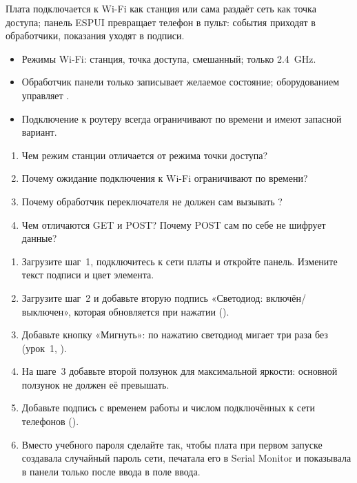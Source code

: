 \begin{summary}
Плата подключается к Wi-Fi как станция или сама раздаёт сеть как точка доступа; панель ESPUI превращает телефон
в пульт: события приходят в обработчики, показания уходят в подписи.

\begin{itemize}[leftmargin=*]
  \item Режимы Wi-Fi: станция, точка доступа, смешанный; только \SI{2.4}{GHz}.
  \item Обработчик панели только записывает желаемое состояние; оборудованием управляет .
  \item Подключение к роутеру всегда ограничивают по времени и имеют запасной вариант.
\end{itemize}
\end{summary}

\begin{selfcheck}
\begin{enumerate}
  \item Чем режим станции отличается от режима точки доступа?
  \item Почему ожидание подключения к Wi-Fi ограничивают по времени?
  \item Почему обработчик переключателя не должен сам вызывать ?
  \item Чем отличаются GET и POST? Почему POST сам по себе не шифрует данные?
\end{enumerate}
\end{selfcheck}

\begin{tasks}
\begin{enumerate}
\item {} Загрузите шаг~1, подключитесь к сети платы и откройте панель. Измените текст подписи и цвет элемента.
\item {} Загрузите шаг~2 и добавьте вторую подпись «Светодиод: включён/выключен», которая обновляется при нажатии ().
\item {} Добавьте кнопку «Мигнуть»: по нажатию светодиод мигает три раза без  (урок~1, ).
\item {} На шаге~3 добавьте второй ползунок для максимальной яркости: основной ползунок не должен её превышать.
\item {} Добавьте подпись с временем работы и числом подключённых к сети телефонов ().
\item {} Вместо учебного пароля сделайте так, чтобы плата при первом запуске создавала случайный пароль сети, печатала его в Serial Monitor и показывала в панели только после ввода в поле ввода.
\end{enumerate}
\end{tasks}
